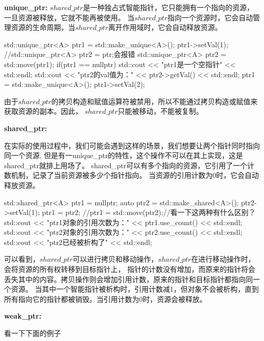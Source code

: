\textbf{unique\_ptr:} 
$shared\_ptr$是一种独占式智能指针，它只能拥有一个指向的资源，一旦资源被释放，它就不能再被使用。
当$shared\_ptr$指向一个资源时，它会自动管理资源的生命周期，当$shared\_ptr$离开作用域时，它会自动释放资源。

\begin{tcode}
{
    std::unique_ptr<A> ptr1 = std::make_unique<A>();
    ptr1->setVal(1);
    //std::unique_ptr<A> ptr2 = ptr;会报错
    std::unique_ptr<A> ptr2 = std::move(ptr1);
    if(ptr1 == nullptr){
        std::cout << "ptr1是一个空指针" << std::endl;
    }
    std::cout << "ptr2的val值为：" << ptr2->getVal() << std::endl;
    ptr1 = std::make_unique<A>();
    ptr1->setVal(2);
}
\end{tcode}
由于$shared\_ptr$的拷贝构造和赋值运算符被禁用，所以不能通过拷贝构造或赋值来获取资源的副本。因此，
$shared\_ptr$只能被移动，不能被复制。

\textbf{shared\_ptr:}

在实际的使用过程中，我们可能会遇到这样的场景，我们想要让两个指针同时指向同一个资源,
但是有一unique\_ptr的特性，这个操作不可以在其上实现，这是shared\_ptr就排上用场了。
shared\_ptr可以有多个指向的资源，它引用了一个计数机制，记录了当前资源被多少个指针指向。
当资源的引用计数为0时，它会自动释放资源。

\begin{tcode}
{
{
    std::shared_ptr<A> ptr1 = nullptr;
    {
        auto ptr2 = std::make_shared<A>();
        ptr2->setVal(1);
        ptr1 = ptr2;
        //ptr1 = std::move(ptr2);//看一下这两种有什么区别？
        std::cout << "ptr1对象的引用次数为：" << ptr1.use_count() << std::endl;
        std::cout << "ptr2对象的引用次数为：" << ptr2.use_count() << std::endl;
    }
    std::cout << "ptr2已经被析构了" << std::endl;
}
}
\end{tcode}
可以看到，$shared\_ptr$可以进行拷贝和移动操作，$shared\_ptr$在进行移动操作时，会将资源的所有权转移到目标指针上，
指针的计数没有增加，而原来的指针将会丢失其中的内容。拷贝操作则会增加引用计数，原来的指针和目标指针都指向同一个资源。
当其中一个智能指针被析构时，引用计数减1，但对象不会被析构，直到所有指向它的指针都被销毁。当引用计数为0时，资源会被释放。

\textbf{weak\_ptr:}

看一下下面的例子

